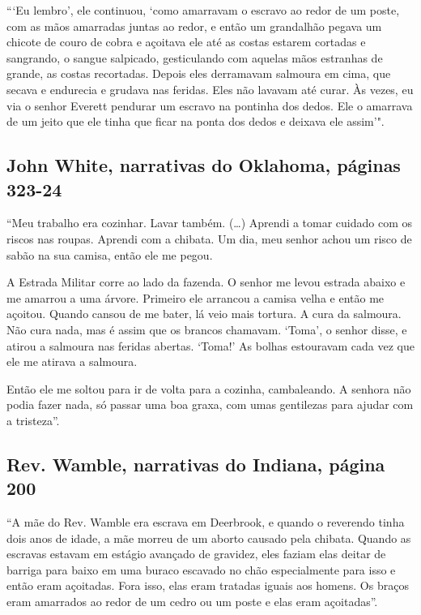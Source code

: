 ```Eu lembro', ele continuou, `como amarravam o escravo ao redor de um
poste, com as mãos amarradas juntas ao redor, e então um grandalhão
pegava um chicote de couro de cobra e açoitava ele até as costas estarem
cortadas e sangrando, o sangue salpicado, gesticulando com aquelas mãos
estranhas de grande, as costas recortadas. Depois eles derramavam
salmoura em cima, que secava e endurecia e grudava nas feridas. Eles não
lavavam até curar. Às vezes, eu via o senhor Everett pendurar um escravo
na pontinha dos dedos. Ele o amarrava de um jeito que ele tinha que
ficar na ponta dos dedos e deixava ele assim'".

\subsection{John White, narrativas do Oklahoma, páginas 323-24}
\label{ref283}

``Meu trabalho era cozinhar. Lavar também. (\ldots{}) Aprendi a tomar
cuidado com os riscos nas roupas. Aprendi com a chibata. Um dia, meu
senhor achou um risco de sabão na sua camisa, então ele me pegou.

A Estrada Militar corre ao lado da fazenda. O senhor me levou estrada
abaixo e me amarrou a uma árvore. Primeiro ele arrancou a camisa velha e
então me açoitou. Quando cansou de me bater, lá veio mais tortura. A
cura da salmoura. Não cura nada, mas é assim que os brancos chamavam.
`Toma', o senhor disse, e atirou a salmoura nas feridas abertas. `Toma!'
As bolhas estouravam cada vez que ele me atirava a salmoura.

Então ele me soltou para ir de volta para a cozinha, cambaleando. A
senhora não podia fazer nada, só passar uma boa graxa, com umas
gentilezas para ajudar com a tristeza''.

\subsection{Rev. Wamble, narrativas do Indiana, página 200}
\label{ref277}

``A mãe do Rev. Wamble era escrava em Deerbrook, e quando o reverendo
tinha dois anos de idade, a mãe morreu de um aborto causado pela
chibata. Quando as escravas estavam em estágio avançado de gravidez,
eles faziam elas deitar de barriga para baixo em uma buraco escavado no
chão especialmente para isso e então eram açoitadas. Fora isso, elas
eram tratadas iguais aos homens. Os braços eram amarrados ao redor de um
cedro ou um poste e elas eram açoitadas''.

